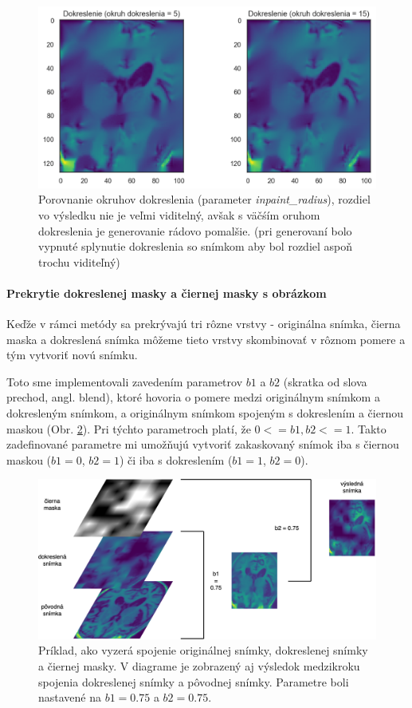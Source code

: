 \begin{figure}[h!]
    \centering
    \includegraphics[width=13cm]{assets/images/inpaint_radius.png}
    \caption{Porovnanie okruhov dokreslenia (parameter \textit{inpaint\_radius}), rozdiel vo výsledku nie je veľmi viditelný, avšak s väčśím oruhom dokreslenia je generovanie rádovo pomalšie. (pri generovaní bolo vypnuté splynutie dokreslenia so snímkom aby bol rozdiel aspoň trochu viditeľný)}
    \label{fig:inpaint_radius}
\end{figure}

\paragraph{Prekrytie dokreslenej masky a čiernej masky s obrázkom}

Keďže v rámci metódy sa prekrývajú tri rôzne vrstvy - originálna snímka, čierna maska a dokreslená snímka môžeme tieto vrstvy skombinovať v rôznom pomere a tým vytvoriť novú snímku.

Toto sme implementovali zavedením parametrov $b1$ a $b2$ (skratka od slova prechod, angl. blend), ktoré hovoria o pomere medzi originálnym snímkom a dokresleným snímkom, a originálnym snímkom spojeným s dokreslením a čiernou maskou (Obr. \ref{fig:risei_layers}). Pri týchto parametroch platí, že $0 <= b1, b2 <= 1$. Takto zadefinované parametre mi umožňujú vytvoriť zakaskovaný snímok iba s čiernou maskou ($b1 = 0$, $b2 = 1$) či iba s dokreslením ($b1 = 1$, $b2 = 0$).

\begin{figure}[h!]
    \centering
    \includegraphics[width=13cm]{assets/images/risei_layers.png}
    \caption{Príklad, ako vyzerá spojenie originálnej snímky, dokreslenej snímky a čiernej masky. V diagrame je zobrazený aj výsledok medzikroku spojenia dokreslenej snímky a pôvodnej snímky. Parametre boli nastavené na $b1 = 0.75$ a $b2 = 0.75$.}
    \label{fig:risei_layers}
\end{figure}

